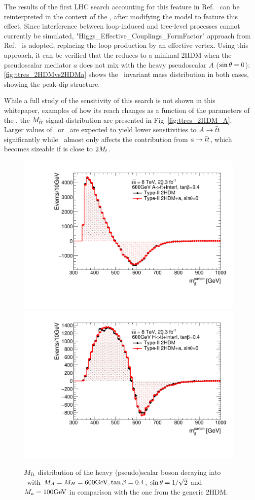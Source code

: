 The results of the first LHC search accounting for this feature in Ref.~\cite{Aaboud:2017hnm} can be reinterpreted in the context of the \hdma, after modifying the \mg model to feature this effect. Since interference between loop-induced and tree-level processes cannot currently be simulated, "Higgs\_Effective\_Couplings\_FormFactor" approach from Ref.~\cite{Aaboud:2017hnm} is adopted, replacing the loop production by an effective vertex. 
Using this approach, it can be verified that the \hdma reduces to a minimal 2HDM when the pseudoscalar mediator $a$ does not mix with the heavy pseudoscalar $A$ ($\sin\theta=0$): \autoref{fig:ttres_2HDMvs2HDMa} shows the \ttbar\ invariant mass distribution in both cases, showing the peak-dip structure. 

While a full study of the sensitivity of this search is not shown in this whitepaper, examples of how its reach changes as a function of the parameters of the \hdma, the $M_{\bar{t}t}$ signal distribution are presented in Fig~\ref{fig:ttres_2HDM_A}. Larger values of \tanb\ or \sinp\ are expected to yield lower sensitivities to $A\rightarrow\bar{t}t$ significantly while \ma\ almost only affects the contribution from $a\rightarrow\bar{t}t$, which becomes sizeable if \ma is close to $2M_{t}$.

\begin{figure}
\centering
\includegraphics[width=.48\textwidth]{texinputs/04_grid/figures/ttres/ttres_2HDMvs2HDMa_A.pdf}
\includegraphics[width=.48\textwidth]{texinputs/04_grid/figures/ttres/ttres_2HDMvs2HDMa_H.pdf}
\caption{$M_{\bar{t}t}$ distribution of the heavy (pseudo)scalar boson decaying into \ttbar\ with $M_{A}=M_{H}=600\textrm{GeV}, \tan\beta=0.4$, $\sin\theta=1/\sqrt{2}$ and $M_a=100\textrm{GeV}$ in comparison with the one from the generic 2HDM.}
\label{fig:ttres_2HDMvs2HDMa}
\end{figure}

